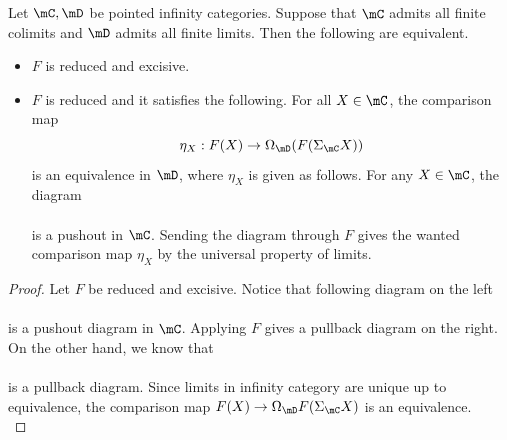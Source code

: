 \documentclass[a4paper]{article}
\begin{document}
\begin{prp}{}{} Let $\mC,\mD$ be pointed infinity categories. Suppose that $\mC$ admits all finite colimits and $\mD$ admits all finite limits. Then the following are equivalent. 
\begin{itemize}
\item $F$ is reduced and excisive. 
\item $F$ is reduced and it satisfies the following. For all $X\in\mC$, the comparison map $$\eta_X:F(X)\to\Omega_\mD(F(\Sigma_\mC X))$$ is an equivalence in $\mD$, where $\eta_X$ is given as follows. For any $X\in\mC$, the diagram \\
\\
is a pushout in $\mC$. Sending the diagram through $F$ gives the wanted comparison map $\eta_X$ by the universal property of limits. 
\end{itemize} 
\begin{proof}
Let $F$ be reduced and excisive. Notice that following diagram on the left \\
\\
is a pushout diagram in $\mC$. Applying $F$ gives a pullback diagram on the right. On the other hand, we know that \\
\\
is a pullback diagram. Since limits in infinity category are unique up to equivalence, the comparison map $F(X)\to\Omega_\mD F(\Sigma_\mC X)$ is an equivalence. \\


\end{proof}
\end{prp}
\end{document}
